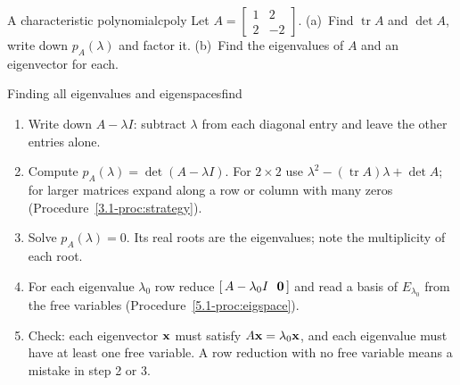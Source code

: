 \documentclass[11pt]{article}
\begin{document}
\begin{kc}{A characteristic polynomial}{cpoly}
Let $A=\begin{bmatrix}1&2\\2&-2\end{bmatrix}$. (a)~Find $\operatorname{tr}A$ and $\det A$, write down $p_A(\lambda)$ and factor it. (b)~Find the eigenvalues of $A$ and an eigenvector for each.
\end{kc}

\begin{proc}{Finding all eigenvalues and eigenspaces}{find}
\begin{enumerate}[itemsep=1pt]
  \item Write down $A-\lambda I$: subtract $\lambda$ from each diagonal entry and leave the other entries alone.
  \item Compute $p_A(\lambda)=\det(A-\lambda I)$. For $2\times2$ use $\lambda^2-(\operatorname{tr}A)\lambda+\det A$; for larger matrices expand along a row or column with many zeros (Procedure~\ref{3.1-proc:strategy}).
  \item Solve $p_A(\lambda)=0$. Its real roots are the eigenvalues; note the multiplicity of each root.
  \item For each eigenvalue $\lambda_0$ row reduce $[\,A-\lambda_0 I\ \ \bv{0}\,]$ and read a basis of $E_{\lambda_0}$ from the free variables (Procedure~\ref{5.1-proc:eigspace}).
  \item Check: each eigenvector $\mathbf{x}$ must satisfy $A\mathbf{x}=\lambda_0\mathbf{x}$, and each eigenvalue must have at least one free variable. A row reduction with no free variable means a mistake in step 2 or 3.
\end{enumerate}
\end{proc}
\end{document}
